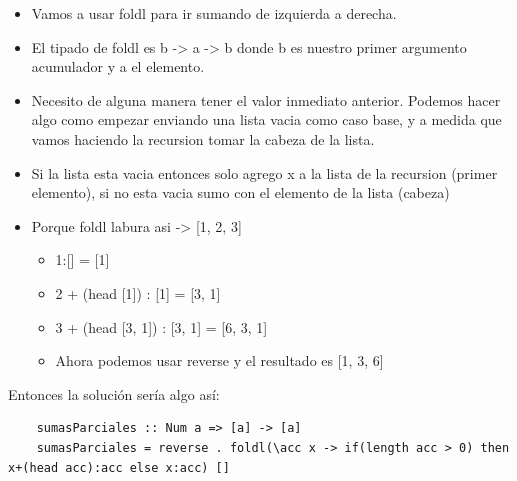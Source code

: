 \documentclass[10pt,a4paper]{article}
\begin{document}
\begin{itemize}
    \item Vamos a usar foldl para ir sumando de izquierda a derecha.
    \item El tipado de foldl es b -> a -> b donde b es nuestro primer argumento acumulador y a el elemento.
    \item Necesito de alguna manera tener el valor inmediato anterior. Podemos hacer algo como empezar enviando una lista vacia como caso base, y a medida que vamos haciendo la recursion tomar la cabeza de la lista.
    \item Si la lista esta vacia entonces solo agrego x a la lista de la recursion (primer elemento), si no esta vacia sumo con el elemento de la lista (cabeza) 
    \item Porque foldl labura asi -> [1, 2, 3]
    \begin{itemize}
        \item 1:[] = [1]
        \item 2 + (head [1]) : [1] = [3, 1]
        \item 3 + (head [3, 1]) : [3, 1] = [6, 3, 1]
        \item Ahora podemos usar reverse y el resultado es [1, 3, 6]
    \end{itemize}
\end{itemize}
Entonces la solución sería algo así: 
\begin{lstlisting}
    sumasParciales :: Num a => [a] -> [a]
    sumasParciales = reverse . foldl(\acc x -> if(length acc > 0) then x+(head acc):acc else x:acc) []
\end{lstlisting}
\end{document}
